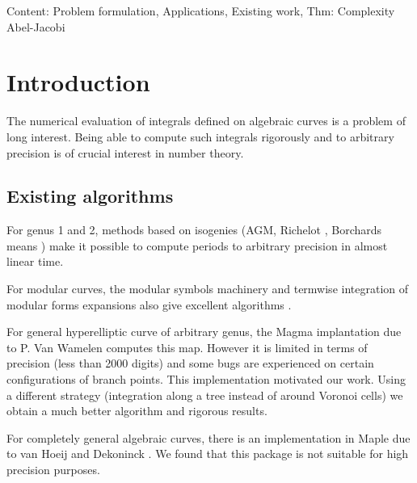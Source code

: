 \documentclass[main.tex]{subfiles}
\begin{document}
  Content: Problem formulation, Applications, Existing work, Thm: Complexity Abel-Jacobi

  \section{Introduction}

  The numerical evaluation of integrals defined on algebraic curves
  is a problem of long interest. Being able to compute such integrals
  rigorously and to arbitrary precision is of crucial interest in
  number theory.

  \subsection{Existing algorithms}

  For genus 1 and 2, methods based on isogenies (AGM, Richelot \cite{BostMestre88}, Borchards means \cite{Labrande16})
  make it possible to compute periods to arbitrary precision in almost linear time.

  For modular curves, the modular symbols machinery and termwise integration of
  modular forms expansions also give excellent algorithms
  \cite[sec 3.2]{Mascot13}.

  For general hyperelliptic curve of arbitrary genus, the Magma implantation
  due to P. Van Wamelen \cite{vanWamelen06} computes this map.
  However it is limited in terms of precision (less
  than 2000 digits) and some bugs are experienced on
  certain configurations of branch points. This implementation motivated our
  work. Using a different strategy
  (integration along a tree instead of around Voronoi cells)
  we obtain a much better algorithm and rigorous results.

  For completely general algebraic curves, there is an implementation in Maple
  due to van Hoeij and Dekoninck \cite{DeconinckvanHoeij01}.
  We found that this package is not suitable for high precision purposes.
\end{document}
